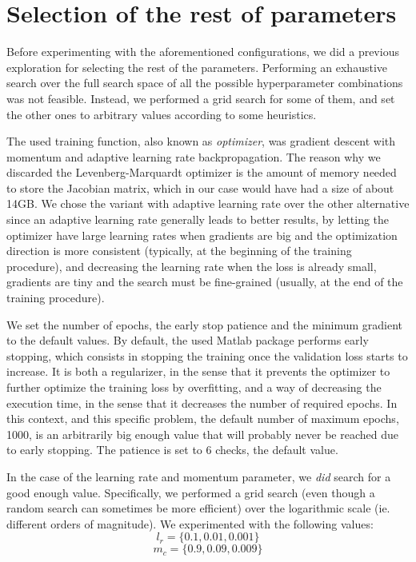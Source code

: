 \documentclass{article}[11pt]
\begin{document}
\section{Selection of the rest of parameters}
\label{sec:rest}

Before experimenting with the aforementioned configurations, we did a previous exploration for selecting the rest of the parameters. Performing an exhaustive search over the full search space of all the possible hyperparameter combinations was not feasible. Instead, we performed a grid search for some of them, and set the other ones to arbitrary values according to some heuristics.

The used training function, also known as \textit{optimizer}, was gradient descent with momentum and adaptive learning rate backpropagation. The reason why we discarded the Levenberg-Marquardt optimizer is the amount of memory needed to store the Jacobian matrix, which in our case would have had a size of about 14GB. We chose the variant with adaptive learning rate over the other alternative since an adaptive learning rate generally leads to better results, by letting the optimizer have large learning rates when gradients are big and the optimization direction is more consistent (typically, at the beginning of the training procedure), and decreasing the learning rate when the loss is already small, gradients are tiny and the search must be fine-grained (usually, at the end of the training procedure).

We set the number of epochs, the early stop patience and the minimum gradient to the default values. By default, the used Matlab package performs early stopping, which consists in stopping the training once the validation loss starts to increase. It is both a regularizer, in the sense that it prevents the optimizer to further optimize the training loss by overfitting, and a way of decreasing the execution time, in the sense that it decreases the number of required epochs. In this context, and this specific problem, the default number of maximum epochs, 1000, is an arbitrarily big enough value that will probably never be reached due to early stopping. The patience is set to 6 checks, the default value.

In the case of the learning rate and momentum parameter, we \textit{did} search for a good enough value. Specifically, we performed a grid search (even though a random search can sometimes be more efficient) over the logarithmic scale (ie. different orders of magnitude). We experimented with the following values:
\[
l_r = \{0.1, 0.01, 0.001\}
\]
\[
m_c = \{0.9, 0.09, 0.009\}
\]
\end{document}
